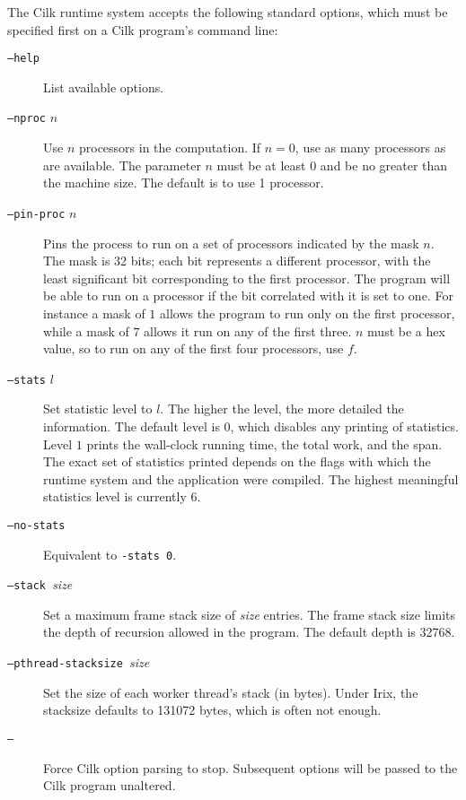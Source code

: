 The Cilk runtime system accepts the following standard options, which
must be specified first on a Cilk program's command line:
\begin{description}
\item[\texttt{--help}\\]  List available options.

\item[\texttt{--nproc} $n$\\] Use $n$ processors in the computation.
If $n=0$, use as many processors as are available.  The parameter $n$
must be at least 0 and be no greater than the machine size.  The
default is to use 1 processor.

\item[\texttt{--pin-proc} $n$\\] Pins the process to run on a set of 
  processors indicated by the mask $n$.  The mask is 32 bits; each 
  bit represents a different processor, with the least significant 
  bit corresponding to the first processor.  The program will be able 
  to run on a processor if the bit correlated with it is set to one. 
  For instance a mask of $1$ allows the program to run only on the 
  first processor, while a mask of $7$ allows it run on any of the 
  first three.  $n$ must be a hex value, so to run on any of the 
  first four processors, use $f$.
  

\item[\texttt{--stats} $l$\\] Set statistic level to $l$.  The higher
  the level, the more detailed the information.  The default level is
  $0$, which disables any printing of statistics.  Level $1$ prints
  the wall-clock running time, the total work, and the span.  The
  exact set of statistics printed depends on the flags with which the
  runtime system and the application were compiled. The highest
  meaningful statistics level is currently $6$.   \indextim{|)}
  
\item[\texttt{--no-stats}\\] Equivalent to \texttt{-stats 0}.
  
\item[\texttt{--stack }{\it size}\\] Set a maximum frame stack size of
  \textit{size} entries.  The frame stack size limits the depth of
  recursion allowed in the program.  The default depth is 32768.
  
\item[\texttt{--pthread-stacksize }{\it size}\\] Set the size of each
worker thread's stack (in bytes).  Under Irix, the stacksize defaults
to 131072 bytes, which is often not enough.

\item[\texttt{--}\\] Force Cilk option parsing to stop.  Subsequent
  options will be passed to the Cilk program unaltered.
\end{description}

